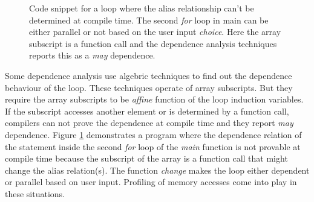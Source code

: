 \documentclass[10pt]{report}          %
\begin{document}
\begin{figure}[h]
\begin{center}
\caption{Code snippet for a loop where the alias relationship can't be determined at compile time.  The second \textit{for} loop in main can be either parallel or not based on the user input \textit{choice}.  Here the array subscript is a function call and the dependence analysis techniques reports this as a \textit{may} dependence.}
\end{center}
\label{fig:motv_exmp_2}
\end{figure}

Some dependence analysis use algebric techniques to find out the dependence behaviour of the loop. \cite{itest} \cite{lrpdtest} \cite{omega}  These techniques operate of array subscripts.  But they require the array subscripts to be \textit{affine} function of the loop induction variables.  If the subscript accesses another element or is determined by a function call, compilers can not prove the dependence at compile time and they report \textit{may} dependence. Figure \ref{fig:motv_exmp_2} demonstrates a program where the dependence relation of the statement inside the second \textit{for} loop of the \textit{main}  function is not provable at compile time because the subscript of the array is a function call that might change the alias relation(s). The function \textit{change} makes the loop either dependent or parallel based on user input.  Profiling of memory accesses come into play in these situations.
\end{document}
